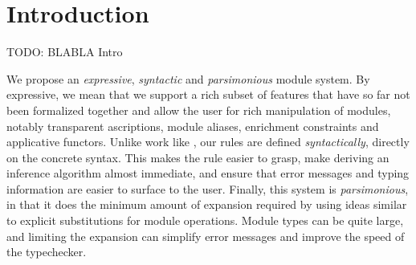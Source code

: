 \section{Introduction}

TODO: BLABLA Intro

We propose an \emph{expressive}, \emph{syntactic} and \emph{parsimonious} module system.
By expressive, we mean that we support a rich subset of features that have so far
not been formalized together and allow the user for rich manipulation of modules, notably transparent ascriptions, module aliases, enrichment constraints and
applicative functors. Unlike work like \cite{fing}, our rules are
defined \emph{syntactically}, directly on the concrete syntax. This makes the rule easier to grasp, make deriving an inference algorithm almost immediate, and
ensure that error messages and typing information are easier to surface to the user.
Finally, this system is \emph{parsimonious}, in that it does the minimum amount of
expansion required by using ideas similar to explicit substitutions for
module operations. Module types can be quite large, and limiting the expansion
can simplify error messages and improve the speed of the typechecker.


